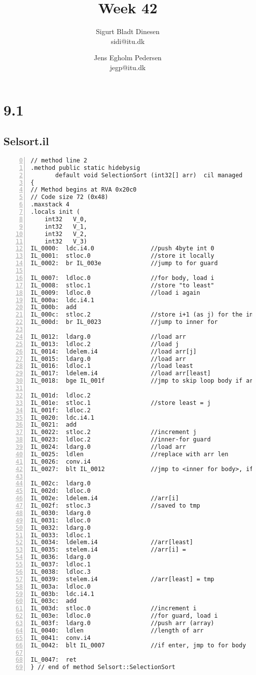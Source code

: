 \documentclass[a4paper, titlepage]{article}
\begin{document}
\title{Week 42}
\author{Sigurt Bladt Dinesen \\sidi{@}itu.dk \and Jens Egholm Pedersen \\jegp{@}itu.dk}
\maketitle
\section*{9.1}
\subsection*{Selsort.il}
\begin{lstlisting}[numbers=left, firstnumber=0, title=Selsort.il]
// method line 2
.method public static hidebysig 
       default void SelectionSort (int32[] arr)  cil managed 
{
// Method begins at RVA 0x20c0
// Code size 72 (0x48)
.maxstack 4
.locals init (
	int32	V_0,
	int32	V_1,
	int32	V_2,
	int32	V_3)
IL_0000:  ldc.i4.0                //push 4byte int 0
IL_0001:  stloc.0                 //store it locally
IL_0002:  br IL_003e              //jump to for guard

IL_0007:  ldloc.0                 //for body, load i
IL_0008:  stloc.1                 //store "to least"
IL_0009:  ldloc.0                 //load i again
IL_000a:  ldc.i4.1
IL_000b:  add 
IL_000c:  stloc.2                 //store i+1 (as j) for the inner loop
IL_000d:  br IL_0023              //jump to inner for

IL_0012:  ldarg.0                 //load arr
IL_0013:  ldloc.2                 //load j
IL_0014:  ldelem.i4               //load arr[j]
IL_0015:  ldarg.0                 //load arr
IL_0016:  ldloc.1                 //load least
IL_0017:  ldelem.i4               //load arr[least]
IL_0018:  bge IL_001f             //jmp to skip loop body if arr[j] > arr[least]

IL_001d:  ldloc.2
IL_001e:  stloc.1                 //store least = j
IL_001f:  ldloc.2
IL_0020:  ldc.i4.1
IL_0021:  add
IL_0022:  stloc.2                 //increment j
IL_0023:  ldloc.2                 //inner-for guard
IL_0024:  ldarg.0                 //load arr
IL_0025:  ldlen                   //replace with arr len
IL_0026:  conv.i4
IL_0027:  blt IL_0012             //jmp to <inner for body>, if len > arr[j]

IL_002c:  ldarg.0
IL_002d:  ldloc.0 
IL_002e:  ldelem.i4               //arr[i]
IL_002f:  stloc.3                 //saved to tmp
IL_0030:  ldarg.0
IL_0031:  ldloc.0 
IL_0032:  ldarg.0 
IL_0033:  ldloc.1 
IL_0034:  ldelem.i4               //arr[least]
IL_0035:  stelem.i4               //arr[i] =
IL_0036:  ldarg.0 
IL_0037:  ldloc.1 
IL_0038:  ldloc.3 
IL_0039:  stelem.i4               //arr[least] = tmp
IL_003a:  ldloc.0 
IL_003b:  ldc.i4.1 
IL_003c:  add 
IL_003d:  stloc.0                 //increment i
IL_003e:  ldloc.0                 //for guard, load i
IL_003f:  ldarg.0                 //push arr (array)
IL_0040:  ldlen                   //length of arr
IL_0041:  conv.i4
IL_0042:  blt IL_0007             //if enter, jmp to for body

IL_0047:  ret 
} // end of method Selsort::SelectionSort
\end{lstlisting}
\end{document}

